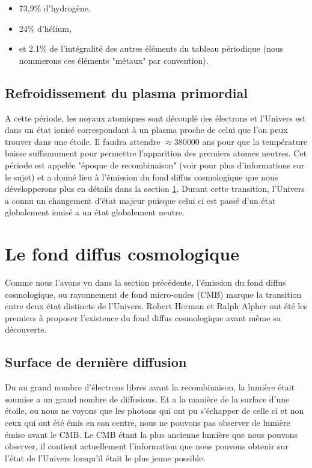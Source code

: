 \begin{itemize}
\item 73,9\% d’hydrogène,
\item 24\% d’hélium,
\item et 2.1\% de l'intégralité des autres éléments du tableau périodique  (nous nommerons ces éléments "métaux" par convention).
\end{itemize}

\subsection{Refroidissement du plasma primordial}
A cette période, les noyaux atomiques sont découplé des électrons et l'Univers est dans un état ionisé correspondant à un plasma proche de celui que l'on peux trouver dans une étoile.
Il faudra attendre $\approx 380 000$ ans pour que la température baisse suffisamment pour permettre l'apparition des premiers atomes neutres.
Cet période est appelée "époque de recombinaison" (voir \cite{2009AN....330..657S} pour plus d'informations sur le sujet) et a donné lieu à l'émission du fond diffus cosmologique que nous développerons plus en détails dans la section \ref{sec:CMB}.
Durant cette transition, l'Univers a connu un changement d'état majeur puisque celui ci est passé d'un état globalement ionisé a un état globalement neutre.

\section{Le fond diffus cosmologique}
\label{sec:CMB}

Comme nous l'avons vu dans la section précédente, l’émission du fond diffus cosmologique, ou rayonnement de fond micro-ondes (\ac{CMB}) marque la transition entre deux état distincts de l'Univers.
Robert Herman et Ralph Alpher ont été les premiers à proposer l’existence du fond diffus cosmologique avant même sa découverte.

\subsection{Surface de dernière diffusion}

Du au grand nombre d'électrons libres avant la recombinaison, la lumière était soumise a un grand nombre de diffusions.
Et a la manière de la surface d'une étoile, ou nous ne voyons que les photons qui ont pu s’échapper de celle ci et non ceux qui ont été émis en son centre, nous ne pouvons pas observer de lumière émise avant le \ac{CMB}.
Le \ac{CMB} étant la plus ancienne lumière que nous pouvons observer, il contient actuellement l'information que nous pouvons obtenir sur l'état de l'Univers lorsqu'il était le plus jeune possible.

